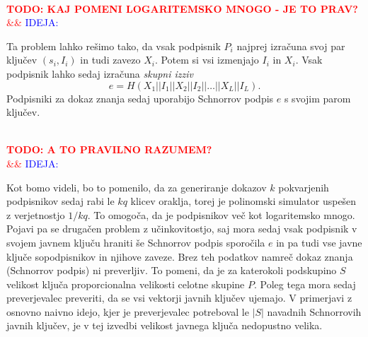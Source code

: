 \documentclass[isrm2, tisk]{fmfdelo}
\newcommand{\todo}[2][]{%
    \textcolor{red}{%
        \\ \textbf{\uppercase{todo: #2}}%
        \\%
        \ifx&#1&%
        \else%
            \textcolor{blue}{\uppercase{ideja:} #1}%
            \\%
        \fi%
    }%
}
\begin{document}
\todo{kaj pomeni logaritemsko mnogo - je to prav?}

Ta problem lahko rešimo tako, da vsak podpisnik $P_i$ najprej izračuna svoj par ključev $(s_i, I_i)$ 
in tudi zavezo $X_i$. Potem si vsi izmenjajo $I_i$ in $X_i$. Vsak podpisnik lahko sedaj izračuna 
\textit{skupni izziv} 
$$ 
e = H(X_1 || I_1 || X_2 || I_2 || \dots || X_L || I_L).
$$
Podpisniki za dokaz znanja sedaj uporabijo Schnorrov podpis $e$ s svojim parom ključev. 

\todo{a to pravilno razumem?}

Kot bomo videli, bo to pomenilo, da za generiranje dokazov $k$ pokvarjenih podpisnikov sedaj rabi le
$kq$ klicev oraklja, torej je polinomski simulator uspešen z verjetnostjo $1/kq$. To omogoča, da je
podpisnikov več kot logaritemsko mnogo. Pojavi pa se drugačen problem z učinkovitostjo, saj mora
sedaj vsak podpisnik v svojem javnem ključu hraniti še Schnorrov podpis sporočila $e$ in pa tudi vse
javne ključe sopodpisnikov in njihove zaveze. Brez teh podatkov namreč dokaz znanja (Schnorrov podpis)
ni preverljiv. To pomeni, da je za katerokoli podskupino $S$ velikost ključa proporcionalna velikosti
celotne skupine $P$. Poleg tega mora sedaj preverjevalec preveriti, da se vsi vektorji javnih ključev
ujemajo. V primerjavi z osnovno naivno idejo, kjer je preverjevalec potreboval le $|S|$ navadnih
Schnorrovih javnih ključev, je v tej izvedbi velikost javnega ključa nedopustno velika.
\end{document}
